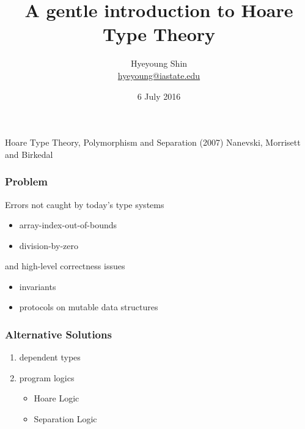 \documentclass[xcolor=dvipsnames,9pt,hide notes,mathserif]{beamer}
\title[HTT]{A gentle introduction to Hoare Type Theory}
\author[Hyeyoung Shin]{Hyeyoung Shin\\
  {\small \url{hyeyoung@iastate.edu}}}
\institute[\url{hyeyoung@iastate.edul}]{%
  {\color{darkred}  {\small Iowa State University}}}
\date{6 July 2016}
\begin{document}
\maketitle 


\begin{frame}
  \frametitle{}
  Hoare Type Theory, Polymorphism and Separation (2007)
  \vskip1cm
  Nanevski, Morrisett and Birkedal
\end{frame}



\begin{frame}
  \frametitle{Problem}
  Errors not caught by today's type systems 
  \begin{itemize}
  \item array-index-out-of-bounds
  \item division-by-zero
  \end{itemize}
\vskip1cm
  and high-level correctness issues
  \begin{itemize}
  \item invariants
  \item protocols on mutable data structures
  \end{itemize}

\end{frame}



\begin{frame}
  \frametitle{Alternative Solutions}
  \begin{enumerate}
  \item dependent types
\vskip1cm
  \item program logics
    \begin{itemize}
    \item Hoare Logic
    \item Separation Logic
    \end{itemize}
  \end{enumerate}
\end{frame}




\end{document}
